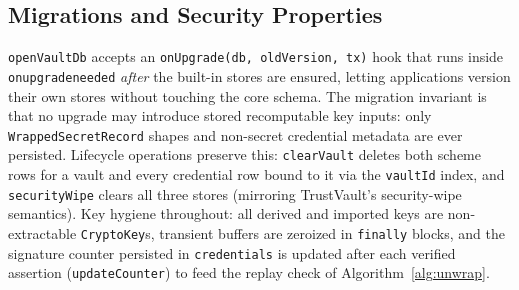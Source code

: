 \documentclass[runningheads]{llncs}
\begin{document}
\subsection{Migrations and Security Properties}
\texttt{openVaultDb} accepts an \texttt{onUpgrade(db, oldVersion, tx)} hook that runs inside \texttt{onupgradeneeded} \emph{after} the built-in stores are ensured, letting applications version their own stores without touching the core schema. The migration invariant is that no upgrade may introduce stored recomputable key inputs: only \texttt{WrappedSecretRecord} shapes and non-secret credential metadata are ever persisted.
Lifecycle operations preserve this: \texttt{clearVault} deletes both scheme rows for a vault and every credential row bound to it via the \texttt{vaultId} index, and \texttt{securityWipe} clears all three stores (mirroring TrustVault's security-wipe semantics).
Key hygiene throughout: all derived and imported keys are non-extractable \texttt{CryptoKey}s, transient buffers are zeroized in \texttt{finally} blocks, and the signature counter persisted in \texttt{credentials} is updated after each verified assertion (\texttt{updateCounter}) to feed the replay check of Algorithm~\ref{alg:unwrap}.
\end{document}
